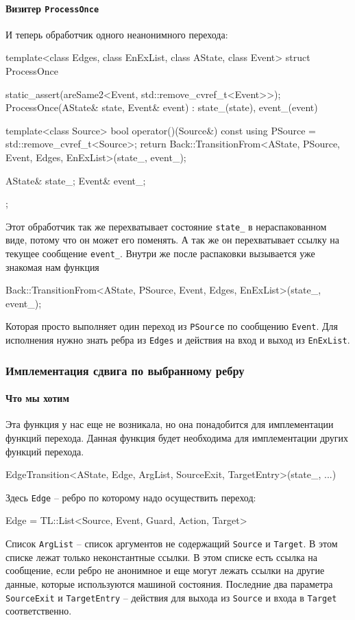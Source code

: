 \documentclass{article}
\begin{document}
{\paragraph{Визитер \texttt{ProcessOnce}}

И теперь обработчик одного неанонимного перехода:
\begin{cppcode}
template<class Edges, class EnExList, class AState, class Event>
struct ProcessOnce {
  static_assert(areSame2<Event, std::remove_cvref_t<Event>>);
  ProcessOnce(AState& state, Event& event) : state_(state), event_(event) {
  }

  template<class Source>
  bool operator()(Source&) const {
    using PSource = std::remove_cvref_t<Source>;
    return Back::TransitionFrom<AState, PSource, Event, Edges, EnExList>(state_, event_);
  }

  AState& state_;
  Event& event_;
};
\end{cppcode}
Этот обработчик так же перехватывает состояние \verb"state_" в нераспакованном виде, потому что он может его поменять.
А так же он перехватывает ссылку на текущее сообщение \verb"event_".
Внутри же после распаковки вызывается уже знакомая нам функция
\begin{cppcode}[\nonumbers]
Back::TransitionFrom<AState, PSource, Event, Edges, EnExList>(state_, event_);
\end{cppcode}
Которая просто выполняет один переход из \verb"PSource" по сообщению \verb"Event".
Для исполнения нужно знать ребра из \verb"Edges" и действия на вход и выход из \verb"EnExList".

\subsubsection{Имплементация сдвига по выбранному ребру}

\paragraph{Что мы хотим}

Эта функция у нас еще не возникала, но она понадобится для имплементации функций перехода.
Данная функция будет необходима для имплементации других функций перехода.
\begin{cppcode}[\nonumbers]
EdgeTransition<AState, Edge, ArgList, SourceExit, TargetEntry>(state_, ...)
\end{cppcode}
Здесь \verb"Edge" -- ребро по которому надо осуществить переход:
\begin{cppcode}[\nonumbers]
Edge = TL::List<Source, Event, Guard, Action, Target>
\end{cppcode}
Список \verb"ArgList" -- список аргументов не содержащий \verb"Source" и \verb"Target".
В этом списке лежат только неконстантные ссылки.
В этом списке есть ссылка на сообщение, если ребро не анонимное и еще могут лежать ссылки на другие данные, которые используются машиной состояния.
Последние два параметра \verb"SourceExit" и \verb"TargetEntry" -- действия для выхода из \verb"Source" и входа в \verb"Target" соответственно.

}
\end{document}
